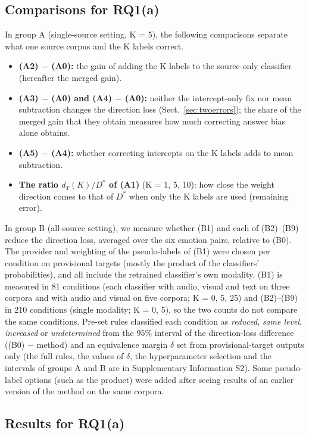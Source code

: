 \subsection{Comparisons for RQ1(a)}\label{sec:rq1a-compare}
In group A (single-source setting, K = 5), the following comparisons separate what one source corpus and the K labels correct.
\begin{itemize}
\item \textbf{(A2) $-$ (A0):} the gain of adding the K labels to the source-only classifier (hereafter the merged gain).
\item \textbf{(A3) $-$ (A0) and (A4) $-$ (A0):} neither the intercept-only fix nor mean subtraction changes the direction loss (Sect.~\ref{sec:twoerrors}); the share of the merged gain that they obtain measures how much correcting answer bias alone obtains.
\item \textbf{(A5) $-$ (A4):} whether correcting intercepts on the K labels adds to mean subtraction.
\item \textbf{The ratio $d_T(K)/D^{*}$ of (A1)} (K = 1, 5, 10): how close the weight direction comes to that of $D^{*}$ when only the K labels are used (remaining error).
\end{itemize}
In group B (all-source setting), we measure whether (B1) and each of (B2)--(B9) reduce the direction loss, averaged over the six emotion pairs, relative to (B0). The provider and weighting of the pseudo-labels of (B1) were chosen per condition on provisional targets (mostly the product of the classifiers' probabilities), and all include the retrained classifier's own modality. (B1) is measured in 81 conditions (each classifier with audio, visual and text on three corpora and with audio and visual on five corpora; K = 0, 5, 25) and (B2)--(B9) in 210 conditions (single modality; K = 0, 5), so the two counts do not compare the same conditions. Pre-set rules classified each condition as \emph{reduced}, \emph{same level}, \emph{increased} or \emph{undetermined} from the 95\% interval of the direction-loss difference ((B0) $-$ method) and an equivalence margin $\delta$ set from provisional-target outputs only (the full rules, the values of $\delta$, the hyperparameter selection and the intervals of groups A and B are in Supplementary Information S2). Some pseudo-label options (such as the product) were added after seeing results of an earlier version of the method on the same corpora.

\subsection{Results for RQ1(a)}

